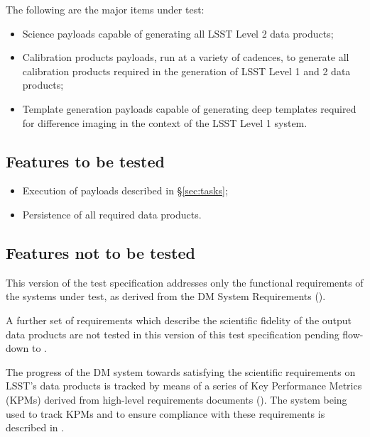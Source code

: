 \documentclass[DM,lsstdraft,STS,toc]{lsstdoc}
\begin{document}
The following are the major items under test:

\begin{itemize}

  \item{Science payloads capable of generating all LSST Level 2 data
  products;}

  \item{Calibration products payloads, run at a variety of cadences, to
  generate all calibration products required in the generation of LSST Level 1
  and 2 data products;}

  \item{Template generation payloads capable of generating deep templates
  required for difference imaging in the context of the LSST Level 1 system.}

\end{itemize}

\subsection{Features to be tested}
\label{sec:feat2test}

\begin{itemize}

  \item{Execution of payloads described in \S\ref{sec:tasks};}
  \item{Persistence of all required data products.}

\end{itemize}


\subsection{Features not to be tested}
\label{sec:featnot2test}

This version of the \product{} test specification addresses only the functional
requirements of the systems under test, as derived from the DM System
Requirements ().

A further set of requirements which describe the scientific fidelity of the
output data products are not tested in this version of this test
specification pending flow-down to .

The progress of the DM system towards satisfying the scientific requirements
on LSST's data products is tracked by means of a series of Key Performance
Metrics (KPMs) derived from high-level requirements documents (). The system being used to track KPMs and to ensure compliance
with these requirements is described in .
\end{document}

